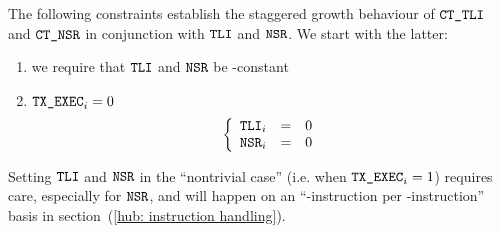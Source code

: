 The following constraints establish the staggered growth behaviour of
$\texttt{CT}\texttt{\_}\texttt{TLI}$ and $\texttt{CT}\texttt{\_}\texttt{NSR}$
in conjunction with
$\texttt{TLI}$ and $\texttt{NSR}$.
We start with the latter:
\begin{enumerate}
	\item we require that $\texttt{TLI}$ and $\texttt{NSR}$ be \hubStamp-constant
	\item \If $\texttt{TX}\texttt{\_EXEC} _{i} = 0$ \Then
		\[
			\left\{ \begin{array}{lcl}
				\texttt{TLI}                 _{i} & = & 0 \\
				\texttt{NSR}        _{i} & = & 0 \\
			\end{array} \right.
		\]
\end{enumerate}
Setting
$\texttt{TLI}$ and $\texttt{NSR}$
in the ``nontrivial case'' (i.e. when $\texttt{TX}\texttt{\_EXEC} _{i} = 1$)
requires care, especially for $\texttt{NSR}$,
and will happen on an ``\evm{}-instruction per \evm{}-instruction'' basis
in section~(\ref{hub: instruction handling}).

